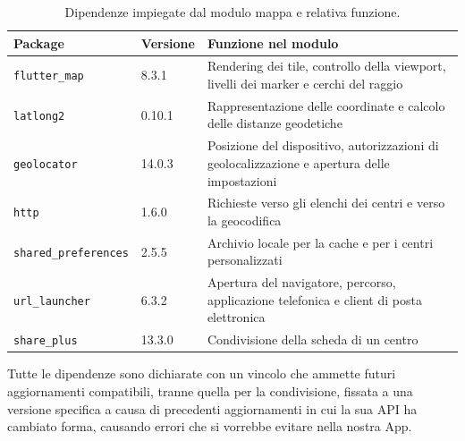 \begin{table}[H]
\footnotesize
\begin{tabularx}{\textwidth}{@{}P{4.1cm} P{1.6cm} L@{}}
\toprule
\textbf{Package} & \textbf{Versione} & \textbf{Funzione nel modulo} \tabularnewline
\midrule
\texttt{flutter\_map} & 8.3.1 & Rendering dei tile, controllo della viewport, livelli dei marker e cerchi del raggio \cite{flutterMapPkg} \tabularnewline
\texttt{latlong2} & 0.10.1 & Rappresentazione delle coordinate e calcolo delle distanze geodetiche \cite{latlong2Pkg} \tabularnewline
\texttt{geolocator} & 14.0.3 & Posizione del dispositivo, autorizzazioni di geolocalizzazione e apertura delle impostazioni \cite{geolocatorPkg} \tabularnewline
\texttt{http} & 1.6.0 & Richieste verso gli elenchi dei centri e verso la geocodifica \cite{httpPkg} \tabularnewline
\texttt{shared\_preferences} & 2.5.5 & Archivio locale per la cache e per i centri personalizzati \cite{sharedPrefsPkg} \tabularnewline
\texttt{url\_launcher} & 6.3.2 & Apertura del navigatore, percorso, applicazione telefonica e client di posta elettronica \cite{urlLauncherPkg} \tabularnewline
\texttt{share\_plus} & 13.3.0 & Condivisione della scheda di un centro \cite{sharePlusPkg} \tabularnewline
\bottomrule
\end{tabularx}
\caption{Dipendenze impiegate dal modulo mappa e relativa funzione.}
\label{tab:dipendenze}
\end{table}

Tutte le dipendenze sono dichiarate con un vincolo che ammette futuri aggiornamenti compatibili, tranne quella per la
condivisione, fissata a una versione specifica a causa di precedenti aggiornamenti in cui la sua API ha cambiato forma,
causando errori che si vorrebbe evitare nella nostra App.

